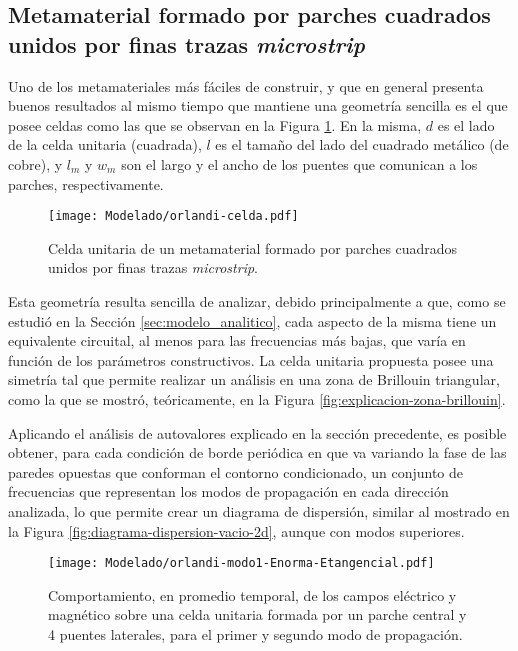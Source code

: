 \subsection{Metamaterial formado por parches cuadrados unidos por finas trazas \textit{microstrip}}
\label{sec:celdas-orlandi}

Uno de los metamateriales más fáciles de construir, y que en general presenta buenos resultados al mismo tiempo que mantiene una geometría sencilla es el que posee celdas como las que se observan en la Figura \ref{fig:celda-orlandi}. En la misma, $d$ es el lado de la celda unitaria (cuadrada), $l$ es el tamaño del lado del cuadrado metálico (de cobre), y $l_m$ y $w_m$ son el largo y el ancho de los puentes que comunican a los parches, respectivamente.

\begin{figure}[h]
	\centering
	\texttt{[image: Modelado/orlandi-celda.pdf]}
	\caption{Celda unitaria de un metamaterial formado por parches cuadrados unidos por finas trazas \textit{microstrip}.}
	\label{fig:celda-orlandi}
\end{figure}

Esta geometría resulta sencilla de analizar, debido principalmente a que, como se estudió en la Sección \ref{sec:modelo_analitico}, cada aspecto de la misma tiene un equivalente circuital, al menos para las frecuencias más bajas, que varía en función de los parámetros constructivos. La celda unitaria propuesta posee una simetría tal que permite realizar un análisis en una zona de Brillouin triangular, como la que se mostró, teóricamente, en la Figura \ref{fig:explicacion-zona-brillouin}.

Aplicando el análisis de autovalores explicado en la sección precedente, es posible obtener, para cada condición de borde periódica en que va variando la fase de las paredes opuestas que conforman el contorno condicionado, un conjunto de frecuencias que representan los modos de propagación en cada dirección analizada, lo que permite crear un diagrama de dispersión, similar al mostrado en la Figura \ref{fig:diagrama-dispersion-vacio-2d}, aunque con modos superiores.

\begin{figure}[h]
	\centering
	\texttt{[image: Modelado/orlandi-modo1-Enorma-Etangencial.pdf]}
	\caption{Comportamiento, en promedio temporal, de los campos eléctrico y magnético sobre una celda unitaria formada por un parche central y 4 puentes laterales, para el primer y segundo modo de propagación.}
	\label{fig:orlandi-analisis-campos}
\end{figure}


